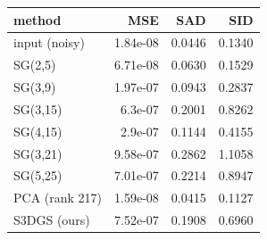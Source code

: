 \begin{tabular}{lrrr}
\toprule
method & MSE & SAD & SID \\
\midrule
input (noisy) & 1.84e-08 & 0.0446 & 0.1340 \\
SG(2,5) & 6.71e-08 & 0.0630 & 0.1529 \\
SG(3,9) & 1.97e-07 & 0.0943 & 0.2837 \\
SG(3,15) & 6.3e-07 & 0.2001 & 0.8262 \\
SG(4,15) & 2.9e-07 & 0.1144 & 0.4155 \\
SG(3,21) & 9.58e-07 & 0.2862 & 1.1058 \\
SG(5,25) & 7.01e-07 & 0.2214 & 0.8947 \\
PCA (rank 217) & 1.59e-08 & 0.0415 & 0.1127 \\
S3DGS (ours) & 7.52e-07 & 0.1908 & 0.6960 \\
\bottomrule
\end{tabular}
